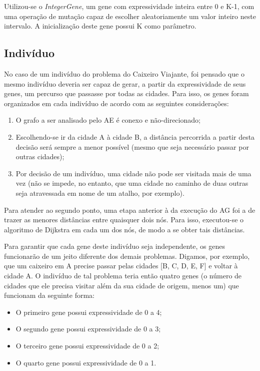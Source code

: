 Utilizou-se o \emph{IntegerGene}, um gene com expressividade inteira entre 0 e K-1, com uma operação de mutação capaz de escolher aleatoriamente um valor inteiro neste intervalo. A inicialização deste gene possui K como parâmetro.

\subsection*{Indivíduo}

No caso de um indivíduo do problema do Caixeiro Viajante, foi pensado que o mesmo indivíduo deveria ser capaz de gerar, a partir da expressividade de seus genes, um percurso que passasse por todas as cidades. Para isso, os genes foram organizados em cada indivíduo de acordo com as seguintes considerações:

\begin{enumerate}[label={(\arabic*)}]
	\item O grafo a ser analisado pelo AE é conexo e não-direcionado;
	\item Escolhendo-se ir da cidade A à cidade B, a distância percorrida a partir desta decisão será sempre a menor possível (mesmo que seja necessário passar por outras cidades);
	\item Por decisão de um indivíduo, uma cidade não pode ser visitada mais de uma vez (não se impede, no entanto, que uma cidade no caminho de duas outras seja atravessada em nome de um atalho, por exemplo).
\end{enumerate}

Para atender ao segundo ponto, uma etapa anterior à da execução do AG foi a de trazer as menores distâncias entre quaisquer dois nós. Para isso, executou-se o algoritmo de Dijkstra \cite{dijkstra1959note} em cada um dos nós, de modo a se obter tais distâncias.

Para garantir que cada gene deste indivíduo seja independente, os genes funcionarão de um jeito diferente dos demais problemas. Digamos, por exemplo, que um caixeiro em A precise passar pelas cidades [B, C, D, E, F] e voltar à cidade A. O indivíduo de tal problema teria então quatro genes (o número de cidades que ele precisa visitar além da sua cidade de origem, menos um) que funcionam da seguinte forma:

\begin{itemize}
	\item O primeiro gene possui expressividade de 0 a 4;
	\item O segundo gene possui expressividade de 0 a 3;
	\item O terceiro gene possui expressividade de 0 a 2;
	\item O quarto gene possui expressividade de 0 a 1.
\end{itemize}

